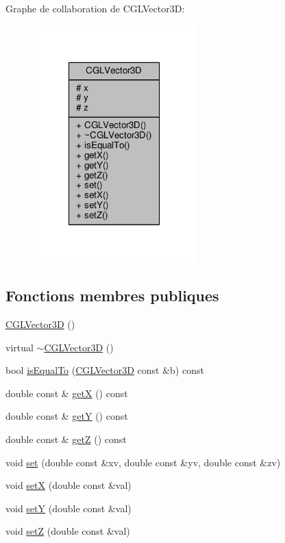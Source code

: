 Graphe de collaboration de C\-G\-L\-Vector3\-D\-:\nopagebreak
\begin{figure}[H]
\begin{center}
\leavevmode
\includegraphics[width=178pt]{d6/d30/class_c_g_l_vector3_d__coll__graph}
\end{center}
\end{figure}
\subsection*{Fonctions membres publiques}
\begin{DoxyCompactItemize}
\item 
\hyperlink{class_c_g_l_vector3_d_a23c221e455e1b5e4733c0e9baf68c1f3}{C\-G\-L\-Vector3\-D} ()
\item 
virtual \hyperlink{class_c_g_l_vector3_d_ae7a23a5f882bbdd9489f51ddc86b0f02}{$\sim$\-C\-G\-L\-Vector3\-D} ()
\item 
bool \hyperlink{class_c_g_l_vector3_d_a339da32afa5a535aec027aba6b92e9b5}{is\-Equal\-To} (\hyperlink{class_c_g_l_vector3_d}{C\-G\-L\-Vector3\-D} const \&b) const 
\item 
double const \& \hyperlink{class_c_g_l_vector3_d_ae470e77a525525e5e51b67324c1b1dea}{get\-X} () const 
\item 
double const \& \hyperlink{class_c_g_l_vector3_d_aee1aa1bba3345d1e1c3983330b66fe4a}{get\-Y} () const 
\item 
double const \& \hyperlink{class_c_g_l_vector3_d_a374bca193aae71220f1349a6ab0778ee}{get\-Z} () const 
\item 
void \hyperlink{class_c_g_l_vector3_d_a15014f4427c214f64699590591cacc8f}{set} (double const \&xv, double const \&yv, double const \&zv)
\item 
void \hyperlink{class_c_g_l_vector3_d_af841beb27455befd974880c342b86a37}{set\-X} (double const \&val)
\item 
void \hyperlink{class_c_g_l_vector3_d_a81324f3311d5fa30a75f43a960bd89db}{set\-Y} (double const \&val)
\item 
void \hyperlink{class_c_g_l_vector3_d_afef476ba51f4f45cb9d64e5d6c1592a4}{set\-Z} (double const \&val)
\end{DoxyCompactItemize}

